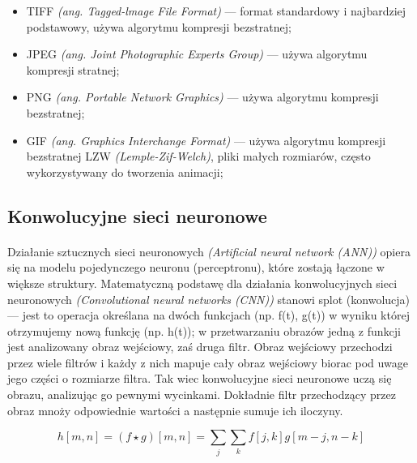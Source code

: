 \documentclass[a4paper,12pt]{article}
\begin{document}
				\begin{spacing}{1}
					\begin{itemize}
						\item TIFF \textit{(ang. Tagged-lmage File Format)} --- format standardowy i najbardziej podstawowy, używa algorytmu kompresji bezstratnej;
						\item JPEG \textit{(ang. Joint Photographic Experts Group)} --- używa algorytmu kompresji stratnej;
						\item PNG \textit{(ang. Portable Network Graphics)} --- używa algorytmu kompresji bezstratnej; 
						\item GIF \textit{(ang. Graphics Interchange Format)} --- używa algorytmu kompresji bezstratnej LZW \textit{(Lemple-Zif-Welch)}, 
							pliki małych rozmiarów, często wykorzystywany do tworzenia animacji;
					\end{itemize}
				\end{spacing}
    
    \subsection{Konwolucyjne sieci neuronowe}
        \paragraph{\indent} Działanie sztucznych sieci neuronowych \textit{(Artificial neural network (ANN))} opiera się na modelu pojedynczego     
			neuronu (perceptronu), które zostają łączone w większe struktury. Matematyczną podstawę dla działania konwolucyjnych sieci neuronowych 
			\textit{(Convolutional neural networks (CNN))} stanowi splot (konwolucja) --- jest to operacja określana na dwóch funkcjach (np. f(t), g(t)) 
			w wyniku której otrzymujemy nową funkcję (np. h(t)); w przetwarzaniu obrazów jedną z funkcji jest analizowany obraz wejściowy, zaś druga filtr.
            Obraz wejściowy przechodzi przez wiele filtrów i każdy z nich mapuje cały obraz wejściowy biorac pod uwage jego części o rozmiarze filtra. 
			Tak wiec konwolucyjne sieci neuronowe uczą się obrazu, analizując go pewnymi wycinkami. Dokładnie filtr przechodzący przez obraz 
			mnoży odpowiednie wartości a następnie sumuje ich iloczyny.
        
            \begin{displaymath}
                h[m, n] = ( f \star g)[m, n] = \sum\limits_{j}\sum\limits_{k}f[j, k]g[m-j, n-k]
            \end{displaymath}
		    \newpage
		    
\end{document}
